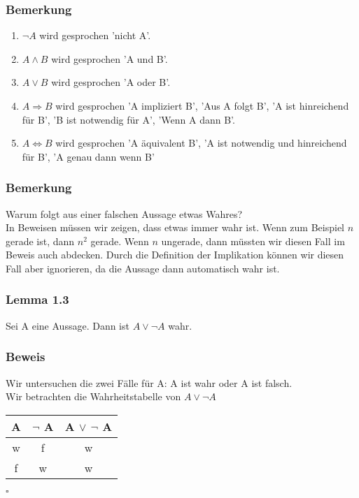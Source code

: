 \documentclass{article}
\begin{document}
\subsubsection*{Bemerkung}
\begin{enumerate}
    \item $\neg A$ wird gesprochen 'nicht A'. 
    \item $A \wedge B$ wird gesprochen 'A und B'. 
    \item $A \vee B$ wird gesprochen 'A oder B'. 
    \item $A \Rightarrow B$ wird gesprochen 'A impliziert B', 'Aus A folgt B', 'A ist hinreichend für B', 'B ist notwendig für A', 'Wenn A dann B'. 
    \item $A \Leftrightarrow B$ wird gesprochen 'A äquivalent B', 'A ist notwendig und hinreichend für B', 'A genau dann wenn B'
\end{enumerate} 
    
\subsubsection*{Bemerkung}
Warum folgt aus einer falschen Aussage etwas Wahres? \\
In Beweisen müssen wir zeigen, dass etwas immer wahr ist. Wenn zum Beispiel $n$ gerade ist, dann $n^2$ gerade. Wenn $n$ ungerade, dann müssten wir diesen Fall im Beweis auch abdecken. Durch die Definition der Implikation können wir diesen Fall aber ignorieren, da die Aussage dann automatisch wahr ist. \\

\subsubsection*{Lemma 1.3}
Sei A eine Aussage. Dann ist $A \vee \neg A$ wahr.\\

\subsubsection*{Beweis}
Wir untersuchen die zwei Fälle für A: A ist wahr oder A ist falsch. \\
Wir betrachten die Wahrheitstabelle von $A \vee \neg A$ \\
\begin{center}
    \begin{tabular}{|c|c|c|}
        \hline
        A & $\neg$ A & A $\vee$ $\neg$ A \\
        \hline
        \hline
        w & f & w \\
        f & w & w \\
        \hline
    \end{tabular}
\end{center} $\square$ \\
\end{document}
